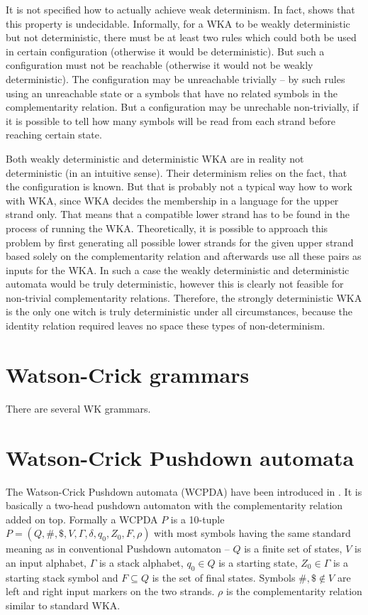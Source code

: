 It is not specified how to actually achieve weak determinism. In fact, \cite{DETERM_WKA} shows that this property is undecidable. Informally, for a WKA to be weakly deterministic but not deterministic, there must be at least two rules which could both be used in certain configuration (otherwise it would be deterministic). But such a configuration must not be reachable (otherwise it would not be weakly deterministic). The configuration may be unreachable trivially -- by such rules using an unreachable state or a symbols that have no related symbols in the complementarity relation. But a configuration may be unrechable non-trivially, if it is possible to tell how many symbols will be read from each strand before reaching certain state.

Both weakly deterministic and deterministic WKA are in reality not deterministic (in an intuitive sense). Their determinism relies on the fact, that the configuration is known. But that is probably not a typical way how to work with WKA, since WKA decides the membership in a language for the upper strand only. That means that a compatible lower strand has to be found in the process of running the WKA. Theoretically, it is possible to approach this problem by first generating all possible lower strands for the given upper strand based solely on the complementarity relation and afterwards use all these pairs as inputs for the WKA. In such a case the weakly deterministic and deterministic automata would be truly deterministic, however this is clearly not feasible for non-trivial complementarity relations. Therefore, the strongly deterministic WKA is the only one witch is truly deterministic under all circumstances, because the identity relation required leaves no space these types of non-determinism.

\section{Watson-Crick grammars}
There are several WK grammars.


\section{Watson-Crick Pushdown automata}
The Watson-Crick Pushdown automata (WCPDA) have been introduced in \cite{WK_PUSHDOWN_AUT}. It is basically a two-head pushdown automaton with the complementarity relation added on top. Formally a WCPDA $P$ is a 10-tuple $P = (Q, \#, \$, V, \Gamma, \delta, q_0, Z_0, F, \rho)$ with most symbols having the same standard meaning as in conventional Pushdown automaton -- $Q$ is a finite set of states, $V$ is an input alphabet, $\Gamma$ is a stack alphabet, $q_0 \in Q$ is a starting state, $Z_0 \in \Gamma$ is a starting stack symbol and $F \subseteq Q$ is the set of final states. Symbols $\#, \$ \notin V$ are left and right input markers on the two strands. $\rho$ is the complementarity relation similar to standard WKA.

